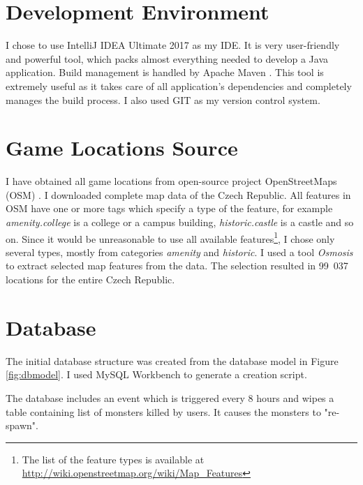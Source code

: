 \section{Development Environment}
I chose to use IntelliJ IDEA Ultimate 2017 \cite{idea} as my IDE. It is very user-friendly and powerful tool, which packs almost everything needed to develop a Java application. Build management is handled by Apache Maven \cite{maven}. This tool is extremely useful as it takes care of all application's dependencies and completely manages the build process. I also used GIT \cite{git} as my version control system. 

\section{Game Locations Source}
I have obtained all game locations from open-source project OpenStreetMaps (OSM) \cite{osm}. I downloaded complete map data of the Czech Republic. All features in OSM have one or more tags which specify a type of the feature, for example \textit{amenity.college} is a college or a campus building, \textit{historic.castle} is a castle and so on. Since it would be unreasonable to use all available features\footnote{The list of the feature types is available at \url{http://wiki.openstreetmap.org/wiki/Map_Features}}, I chose only several types, mostly from categories \textit{amenity} and \textit{historic}. I used a tool \textit{Osmosis} \cite{osmosis} to extract selected map features from the data. The selection resulted in 99~037 locations for the entire Czech Republic.

\section{Database}
The initial database structure was created from the database model in Figure \ref{fig:dbmodel}. I used MySQL Workbench \cite{mysqlworkbench} to generate a creation script.

The database includes an event which is triggered every 8 hours and wipes a table containing list of monsters killed by users. It causes the monsters to "re-spawn".  

